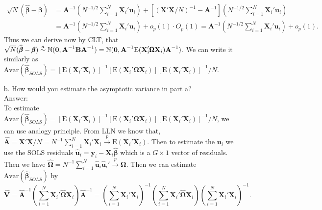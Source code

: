 \documentclass[10pt]{article}
\newcommand\asym{\stackrel{\mathclap{a}}{\sim}}
\newcommand\convprob{\xrightarrow{p}}
\newcommand{\N}{\mathbb{N}}
\newcommand{\E}{\text{E}}
\newcommand{\Av}{\text{Avar}}
\begin{document}
\begin{enumerate}
\begin{align*}
    \sqrt{N}(\hat{\pmb{\beta}}-\pmb{\beta})&=\textbf{A}^{-1}(N^{-1/2}\sum_{i=1}^N \textbf{X}_i'\textbf{u}_i)+[(\textbf{X}'\textbf{X}/N)^{-1}-\textbf{A}^{-1}](N^{-1/2}\sum_{i=1}^N \textbf{X}_i'\textbf{u}_i)\\
    &=\textbf{A}^{-1}(N^{-1/2}\sum_{i=1}^N \textbf{X}_i'\textbf{u}_i)+o_p(1)\cdot O_p(1)=\textbf{A}^{-1}(N^{-1/2}\sum_{i=1}^N \textbf{X}_i'\textbf{u}_i)+o_p(1).
\end{align*}
Thus we can derive now by CLT, that $\sqrt{N}(\hat{\pmb{\beta}}-\pmb{\beta})\asym \N(\textbf{0},\textbf{A}^{-1}\textbf{B}\textbf{A}^{-1})=\N(\textbf{0},\textbf{A}^{-1}\E(\textbf{X}_i'\pmb{\Omega}\textbf{X}_i)\textbf{A}^{-1}).$ We can write it similarly as $\Av(\hat{\pmb{\beta}}_{SOLS})=[\E(\textbf{X}_i'\textbf{X}_i)]^{-1}[\E(\textbf{X}_i'\pmb{\Omega}\textbf{X}_i)][\E(\textbf{X}_i'\textbf{X}_i)]^{-1}/N.$ 

\item[b.] How would you estimate the asymptotic variance in part a? 
\\ Answer:\\
To estimate $\Av(\hat{\pmb{\beta}}_{SOLS})=[\E(\textbf{X}_i'\textbf{X}_i)]^{-1}[\E(\textbf{X}_i'\pmb{\Omega}\textbf{X}_i)][\E(\textbf{X}_i'\textbf{X}_i)]^{-1}/N$, we can use analogy principle. From LLN we know that, $\hat{\textbf{A}}=\textbf{X}'\textbf{X}/N=N^{-1}\sum_{i=1}^N \textbf{X}_i'\textbf{X}_i\convprob \E(\textbf{X}_i'\textbf{X}_i)$. Then to estimate the $\textbf{u}_i$ we use the SOLS residuals $\hat{\textbf{u}}_i=\textbf{y}_i-\textbf{X}_i\hat{\pmb{\beta}}$ which is a $G\times 1$ vector of residuals. Then we have $\hat{\pmb{\Omega}}=N^{-1}\sum_{i=1}^N\hat{\textbf{u}}_i\hat{\textbf{u}}_i' \convprob \pmb{\Omega}$. Then we can estimate $\Av(\hat{\pmb{\beta}}_{SOLS})$ by
\[\hat{\textbf{V}}=\hat{\textbf{A}}^{-1}\left(\sum_{i=1}^N\textbf{X}_i'\hat{\pmb{\Omega}}\textbf{X}_i\right)\hat{\textbf{A}}^{-1}=\left(\sum_{i=1}^N \textbf{X}_i'\textbf{X}_i\right)^{-1}\left(\sum_{i=1}^N\textbf{X}_i'\hat{\pmb{\Omega}}\textbf{X}_i\right)\left(\sum_{i=1}^N \textbf{X}_i'\textbf{X}_i\right)^{-1}.\]


\end{enumerate}
\end{document}
